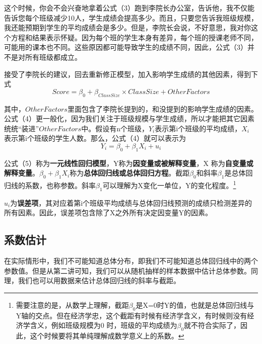\documentclass[cn,12pt,math=newtx,citestyle=gb7714-2015,bibstyle=gb7714-2015]{elegantbook}
\begin{document}
	这个时候，你会不会兴奋地拿着公式（3）跑到李院长办公室，告诉他，我不仅能告诉您每个班级减少10人，学生成绩会提高多少。而且，只要您告诉我班级规模，我还能预期到学生的平均成绩会是多少。但是，李院长会说，不好意思，我对你这个方程和结果表示怀疑。因为每个班的学生本身有差异，每个班的授课老师不同，可能用的课本也不同。这些原因都可能导致学生的成绩不同，因此，公式（3）并不是对所有班级都成立。
	
	接受了李院长的建议，回去重新修正模型，加入影响学生成绩的其他因素，得到下式
	\begin{equation}
		Score=\beta_0+\beta_{ClassSize}\times{ClassSize}+OtherFactors
	\end{equation}
	
	其中，$OtherFactors$里面包含了李院长提到的，和没提到的影响学生成绩的因素。公式（4）更一般化，因为我们关注于班级规模与学生成绩，所以才能把其它因素统统“装进”$OtherFactors$中。假设有n个班级，$Y_i$表示第i个班级的平均成绩，$X_i$ 表示第i个班级的学生人数。那么，公式（4）就可以表示为
	\begin{equation}
		Y_i=\beta_0+\beta_1X_i+u_i
	\end{equation}
	
	公式（5）称为\textbf{一元线性回归模型}，Y称为\textbf{因变量或被解释变量}，X 称为\textbf{自变量或解释变量}。$\beta_0+\beta_1X_i$称为\textbf{总体回归线或总体回归方程}。截距$\beta_0$和斜率$\beta_1$是总体回归线的系数，也称参数。斜率$\beta_1$可以理解为X变化一单位，Y的变化程度。\footnote{需要注意的是，从数学上理解，截距$\beta_0$是X=0时Y的值，也就是总体回归线与Y轴的交点。但在经济学忠，这个截距有时候有经济学含义，有时候则没有经济学含义，例如班级规模为0 时，班级的平均成绩为$\beta_0$就不符合实际了，因此，这个时候要将其单纯理解成数学意义上的系数。}
	
	$u_i$为\textbf{误差项}，其对应着第i个班级平均成绩与总体回归线预测的成绩只检测差异的所有因素。因此，误差项包含除了X之外所有决定因变量Y的因素。
	
	\subsection{系数估计}
	在实际情形中，我们不可能知道总体分布，即我们不可能知道总体回归线中的两个参数值。但是从第二讲可知，我们可以从随机抽样的样本数据中估计总体参数。同理，我们也可以用数据来估计总体回归线的斜率与截距。
	
\end{document}
